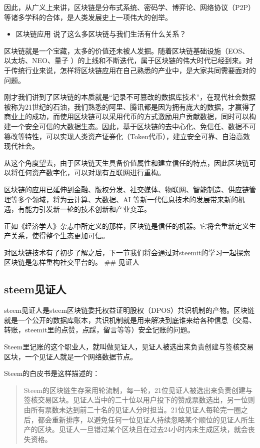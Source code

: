 \documentclass[]{ctexbook}
\providecommand{\tightlist}{%
  \setlength{\itemsep}{0pt}\setlength{\parskip}{0pt}}
\begin{document}
因此，从广义上来讲，区块链是分布式系统、密码学、博弈论、网络协议（P2P）等诸多学科的合体，是人类发展史上一项伟大的创举。

\begin{itemize}
\tightlist
\item
  区块链应用
  说了这么多区块链与我们生活有什么关系？
\end{itemize}

区块链就是一个宝藏，太多的价值还未被人发掘。随着区块链基础设施（EOS、以太坊、NEO、量子 ）的上线和不断迭代，属于区块链的伟大时代已经到来。对于传统行业来说，怎样将区块链应用在自己熟悉的产业中，是大家共同需要面对的问题。

刚才我们讲到了区块链的本质就是``记录不可篡改的数据库技术''，在现代社会数据被称为21世纪的石油，我们熟悉的阿里、腾讯都是因为拥有庞大的数据，才赢得了商业上的成功，而使用区块链可以采用代币的方式激励用户贡献数据，同时可以构建一个安全可信的大数据生态。因此，基于区块链的去中心化、免信任、数据不可篡改等特性，可以实现人类资产证券化（Token代币），建立安全可靠、自治高效现代社会。

从这个角度望去，由于区块链天生具备价值属性和建立信任的特点，因此区块链可以将任何资产数字化，可以对现有互联网进行重构。

区块链的应用已延伸到金融、版权分发、社交媒体、物联网、智能制造、供应链管理等多个领域，将为云计算、大数据、AI 等新一代信息技术的发展带来新的机遇，有能力引发新一轮的技术创新和产业变革。

正如《经济学人》杂志中所定义的那样，区块链是信任的机器。它将会重新定义生产关系，使得整个生态更加可信。

对区块链技术有了初步了解之后，下一节我们将会通过对steemit的学习一起探索区块链是怎样重构社交平台的。
\#\# 见证人

\hypertarget{steem_jzr}{%
\subsection{steem见证人}\label{steem_jzr}}

steem见证人是steem区块链委托权益证明股权（DPOS）共识机制的产物。区块链就是一个公开的数据库账本，共识机制就是用来解决到底谁来给各种信息（交易、转账，steemit里的点赞，点踩，留言等等）安全记账的问题。

Steem里记账的这个职业人，就叫做见证人，见证人被选出来负责创建与签核交易区块，一个见证人就是一个网络数据节点。

Steem的白皮书是这样描述的：

\begin{quote}
Steem的区块链生存采用轮流制，每一轮，21位见证人被选出来负责创建与签核交易区块。见证人当中的二十位以用户投下的赞成票数选出，另一位则由所有票数未达到前二十名的见证人分时担当。21位见证人每轮完一圈之后，都会重新排序，以避免任何一位见证人持续忽略某个顺位的见证人所生产的区块。见证人一旦错过某个区块且在过去24小时内未生成区块，就会丧失资格。
\end{quote}
\end{document}

